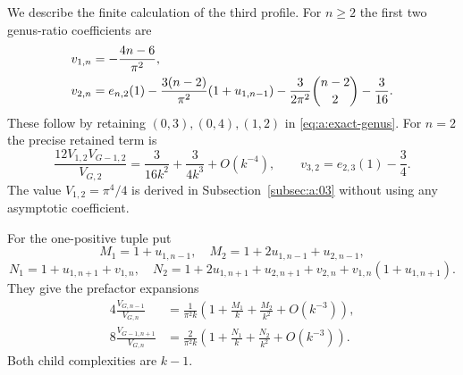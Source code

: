 We describe the finite calculation of the third profile.
For $n\geq2$ the first two genus-ratio coefficients are
\begin{align}
 v_{1,n}&=-\frac{4n-6}{\pi^2},\notag\\
 v_{2,n}&=e_{n,2}(1)
 -\frac{3(n-2)}{\pi^2}(1+u_{1,n-1})
 -\frac{3}{2\pi^2}\binom{n-2}{2}-\frac3{16}.
 \label{eq:a:genus-first-two}
\end{align}
These follow by retaining $(0,3),(0,4),(1,2)$ in
\eqref{eq:a:exact-genus}. For $n=2$ the precise retained term is
\begin{equation}\label{eq:a:genus-small-split}
 \frac{12V_{1,2}V_{G-1,2}}{V_{G,2}}
   =\frac3{16k^2}+\frac3{4k^3}+O(k^{-4}),\qquad
 v_{3,2}=e_{2,3}(1)-\frac34.
\end{equation}
The value $V_{1,2}=\pi^4/4$ is derived in
Subsection~\ref{subsec:a:03} without using any asymptotic coefficient.

For the one-positive tuple put
\[
 M_1=1+u_{1,n-1},\quad M_2=1+2u_{1,n-1}+u_{2,n-1},
\]
\[
 N_1=1+u_{1,n+1}+v_{1,n},\quad
 N_2=1+2u_{1,n+1}+u_{2,n+1}+v_{2,n}
                              +v_{1,n}(1+u_{1,n+1}).
\]
They give the prefactor expansions
\begin{align*}
 4\frac{V_{G,n-1}}{V_{G,n}}
 &=\frac1{\pi^2k}\left(1+\frac{M_1}{k}+\frac{M_2}{k^2}
                                      +O(k^{-3})\right),\\
 8\frac{V_{G-1,n+1}}{V_{G,n}}
 &=\frac2{\pi^2k}\left(1+\frac{N_1}{k}+\frac{N_2}{k^2}
                                      +O(k^{-3})\right).
\end{align*}
Both child complexities are $k-1$.

